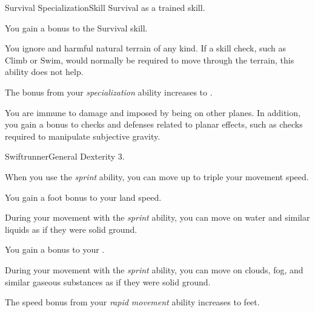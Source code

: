   \begin{feat}{Survival Specialization}{Skill}
    \featpre Survival as a trained skill.

     You gain a  bonus to the Survival skill.

     You ignore  and harmful natural terrain of any kind.
    If a skill check, such as Climb or Swim, would normally be required to move through the terrain, this ability does not help.

     The bonus from your \textit{specialization} ability increases to .

     You are immune to damage and  imposed by being on other planes.
    In addition, you gain a  bonus to checks and defenses related to planar effects, such as checks required to manipulate subjective gravity.
  \end{feat}

  \begin{feat}{Swiftrunner}{General}
    \featpre Dexterity 3.

     When you use the \textit{sprint} ability, you can move up to triple your movement speed.

     You gain a  foot bonus to your land speed.

     During your movement with the \textit{sprint} ability, you can move on water and similar liquids as if they were solid ground.

     You gain a  bonus to your .

     During your movement with the \textit{sprint} ability, you can move on clouds, fog, and similar gaseous substances as if they were solid ground.

     The speed bonus from your \textit{rapid movement} ability increases to  feet.
  \end{feat}

